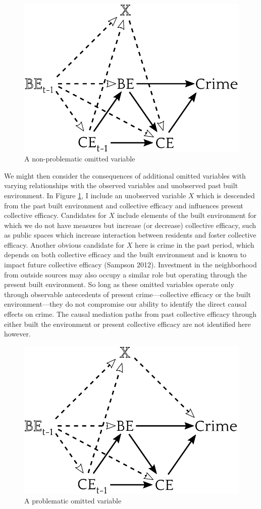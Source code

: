 \documentclass [11pt, proquest] {uwthesis}[2015/03/03]
\begin{document}
\begin{figure}

{\centering \includegraphics[width=0.6\linewidth]{./figure/appendix/6_still_blocked} 

}

\caption{A non-problematic omitted variable}\label{fig:dag6}
\end{figure}
We might then consider the consequences of additional omitted variables with varying relationships with the observed variables and unobserved past built environment. In Figure \ref{fig:dag6}, I include an unobserved variable \(X\) which is descended from the past built environment and collective efficacy and influences present collective efficacy. Candidates for \(X\) include elements of the built environment for which we do not have measures but increase (or decrease) collective efficacy, such as public spaces which increase interaction between residents and foster collective efficacy. Another obvious candidate for \(X\) here is crime in the past period, which depends on both collective efficacy and the built environment and is known to impact future collective efficacy (Sampson 2012). Investment in the neighborhood from outside sources may also occupy a similar role but operating through the present built environment. So long as these omitted variables operate only through observable antecedents of present crime---collective efficacy or the built environment---they do not compromise our ability to identify the direct causal effects on crime. The causal mediation paths from past collective efficacy through either built the environment or present collective efficacy are not identified here however.
\begin{figure}

{\centering \includegraphics[width=0.6\linewidth]{./figure/appendix/7_backdoor_path} 

}

\caption{A problematic omitted variable}\label{fig:dag7}
\end{figure}
\end{document}
